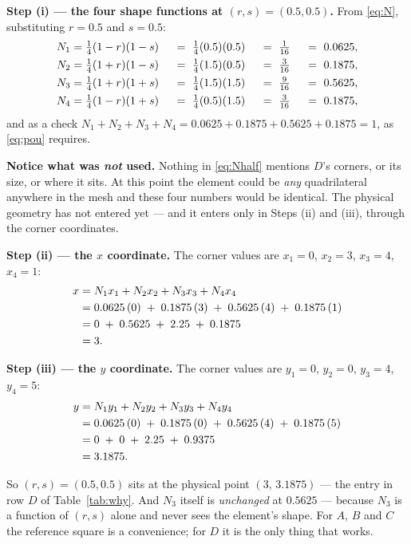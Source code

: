 \documentclass[11pt]{article}
\begin{document}
\medskip
\textbf{Step (i) --- the four shape functions at $(r,s)=(0.5,0.5)$.}
From \eqref{eq:N}, substituting $r=0.5$ and $s=0.5$:
\begin{alignat}{4}
  N_{1}&=\tfrac14(1-r)(1-s)\ &&=\ \tfrac14(0.5)(0.5)\ &&=\ \tfrac{1}{16}\ &&=\ 0.0625,\notag\\
  N_{2}&=\tfrac14(1+r)(1-s)\ &&=\ \tfrac14(1.5)(0.5)\ &&=\ \tfrac{3}{16}\ &&=\ 0.1875,\notag\\
  N_{3}&=\tfrac14(1+r)(1+s)\ &&=\ \tfrac14(1.5)(1.5)\ &&=\ \tfrac{9}{16}\ &&=\ 0.5625,\notag\\
  N_{4}&=\tfrac14(1-r)(1+s)\ &&=\ \tfrac14(0.5)(1.5)\ &&=\ \tfrac{3}{16}\ &&=\ 0.1875,
  \label{eq:Nhalf}
\end{alignat}
and as a check $N_{1}+N_{2}+N_{3}+N_{4}=0.0625+0.1875+0.5625+0.1875=1$,
as \eqref{eq:pou} requires.

\medskip
\noindent
\textbf{Notice what was \emph{not} used.} Nothing in \eqref{eq:Nhalf} mentions
$D$'s corners, or its size, or where it sits. At this point the element could be
\emph{any} quadrilateral anywhere in the mesh and these four numbers would be
identical. The physical geometry has not entered yet --- and it enters only in
Steps (ii) and (iii), through the corner coordinates.

\medskip

\textbf{Step (ii) --- the $x$ coordinate.} The corner values are
$x_{1}=0$, $x_{2}=3$, $x_{3}=4$, $x_{4}=1$:
\begin{align}
  x&=N_{1}x_{1}+N_{2}x_{2}+N_{3}x_{3}+N_{4}x_{4}\notag\\
   &=0.0625\,(0)\;+\;0.1875\,(3)\;+\;0.5625\,(4)\;+\;0.1875\,(1)\notag\\
   &=0\;+\;0.5625\;+\;2.25\;+\;0.1875\notag\\
   &=3 .\label{eq:xmap}
\end{align}

\medskip
\textbf{Step (iii) --- the $y$ coordinate.} The corner values are
$y_{1}=0$, $y_{2}=0$, $y_{3}=4$, $y_{4}=5$:
\begin{align}
  y&=N_{1}y_{1}+N_{2}y_{2}+N_{3}y_{3}+N_{4}y_{4}\notag\\
   &=0.0625\,(0)\;+\;0.1875\,(0)\;+\;0.5625\,(4)\;+\;0.1875\,(5)\notag\\
   &=0\;+\;0\;+\;2.25\;+\;0.9375\notag\\
   &=3.1875 .\label{eq:ymap}
\end{align}

\medskip
So $(r,s)=(0.5,0.5)$ sits at the physical point $(3,\,3.1875)$ --- the entry
in row $D$ of Table~\ref{tab:why}.
And $N_{3}$ itself is \emph{unchanged} at $0.5625$ --- because $N_{3}$ is a
function of $(r,s)$ alone and never sees the element's shape. For $A$, $B$ and
$C$ the reference square is a convenience; for $D$ it is the only thing that
works.
\end{document}
